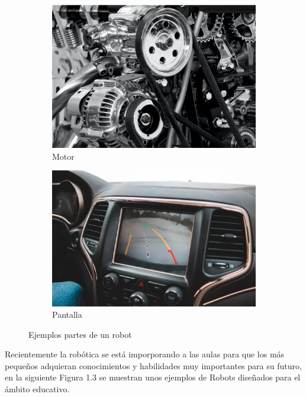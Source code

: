 \begin{figure}[h]
\begin{subfigure}{.5\textwidth}
  \centering
  \includegraphics[width=.6\linewidth]{chapters/images/motor.png}  
  \caption{Motor}
  \label{fig:sub-third}
\end{subfigure}
\begin{subfigure}{.5\textwidth}
  \centering
  \includegraphics[width=.6\linewidth]{chapters/images/pantalla.jpeg}  
  \caption{Pantalla}
  \label{fig:sub-fourth}
\end{subfigure}
\caption{Ejemplos partes de un robot}
\label{fig:partes robot}
\end{figure}

Recientemente la robótica se está imporporando a las aulas para que los más pequeños adquieran conocimientos y habilidades muy importantes para su futuro, en la siguiente Figura 1.3 se muestran unos ejemplos de Robots diseñados para el ámbito educativo.

